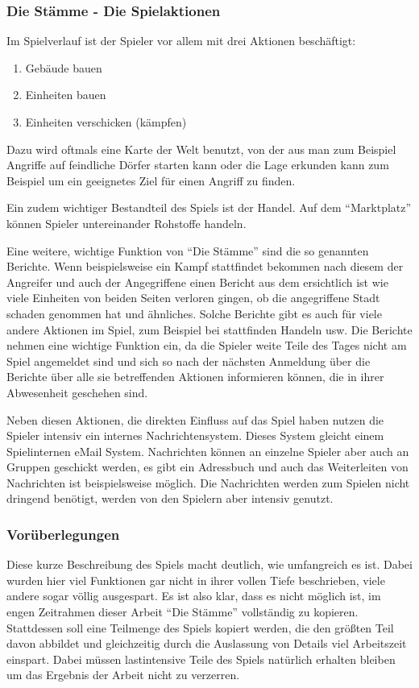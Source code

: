\documentclass[10pt]{scrartcl}
\begin{document}
  \subsubsection{Die Stämme - Die Spielaktionen}
  
  Im Spielverlauf ist der Spieler vor allem mit drei Aktionen beschäftigt:
  
  \begin{enumerate}
    \item Gebäude bauen
    \item Einheiten bauen
    \item Einheiten verschicken (kämpfen)
  \end{enumerate}
  
  Dazu wird oftmals eine Karte der Welt benutzt, von der aus man zum Beispiel Angriffe auf feindliche Dörfer starten kann oder die Lage erkunden kann zum Beispiel um ein geeignetes Ziel für einen Angriff zu finden.
  
  Ein zudem wichtiger Bestandteil des Spiels ist der Handel. Auf dem ``Marktplatz'' können Spieler untereinander Rohstoffe handeln.
  
  Eine weitere, wichtige Funktion von ``Die Stämme'' sind die so genannten Berichte. Wenn beispielsweise ein Kampf stattfindet bekommen nach diesem der Angreifer und auch der Angegriffene einen Bericht aus dem ersichtlich ist wie viele Einheiten von beiden Seiten verloren gingen, ob die angegriffene Stadt schaden genommen hat und ähnliches. Solche Berichte gibt es auch für viele andere Aktionen im Spiel, zum Beispiel bei stattfinden Handeln usw. Die Berichte nehmen eine wichtige Funktion ein, da die Spieler weite Teile des Tages nicht am Spiel angemeldet sind und sich so nach der nächsten Anmeldung über die Berichte über alle sie betreffenden Aktionen informieren können, die in ihrer Abwesenheit geschehen sind.
  
  Neben diesen Aktionen, die direkten Einfluss auf das Spiel haben nutzen die Spieler intensiv ein internes Nachrichtensystem. Dieses System gleicht einem Spielinternen eMail System. Nachrichten können an einzelne Spieler aber auch an Gruppen geschickt werden, es gibt ein Adressbuch und auch das Weiterleiten von Nachrichten ist beispielsweise möglich. Die Nachrichten werden zum Spielen nicht dringend benötigt, werden von den Spielern aber intensiv genutzt.
  
  \subsubsection{Vorüberlegungen}
  Diese kurze Beschreibung des Spiels macht deutlich, wie umfangreich es ist. Dabei wurden hier viel Funktionen gar nicht in ihrer vollen Tiefe beschrieben, viele andere sogar völlig ausgespart. Es ist also klar, dass es nicht möglich ist, im engen Zeitrahmen dieser Arbeit ``Die Stämme'' vollständig zu kopieren. Stattdessen soll eine Teilmenge des Spiels kopiert werden, die den größten Teil davon abbildet und gleichzeitig durch die Auslassung von Details viel Arbeitszeit einspart. Dabei müssen lastintensive Teile des Spiels natürlich erhalten bleiben um das Ergebnis der Arbeit nicht zu verzerren.
  
\end{document}
